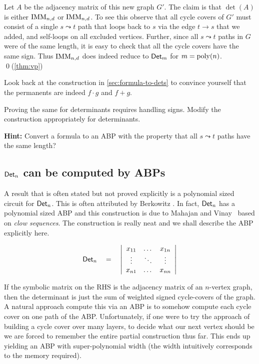 Let $A$ be the adjacency matrix of this new graph $G'$. 
The claim is that $\det(A)$ is either $\operatorname{\mathrm{IMM}}_{n,d}$ or $\operatorname{\mathrm{IMM}}_{n,d}$. 
To see this observe that all cycle covers of $G'$ must consist of a single $s\leadsto t$ path that loops back to $s$ via the edge $t\rightarrow s$ that we added, and self-loops on all excluded vertices. 
Further, since all $s\leadsto t$ paths in $G$ were of the same length, it is easy to check that all the cycle covers have the same sign. 
Thus $\operatorname{\mathrm{IMM}}_{n,d}$ does indeed reduce to $\operatorname{\mathsf{Det}}_m$ for $m = \operatorname{poly}(n)$. \qed {\footnotesize (\autoref{thm:vp})}\\

\begin{exercise}
Look back at the construction in \autoref{sec:formula-to-dets} to convince yourself that the permanents are indeed $f \cdot g$ and $f + g$. 

Proving the same for determinants requires handling signs. Modify the construction appropriately for determinants. 

{\bf Hint:} Convert a formula to an ABP with the property that all $s \leadsto t$ paths have the same length?
\end{exercise}


\subsection{$\operatorname{\mathsf{Det}}_n$ can be computed by ABPs}

A result that is often stated but not proved explicitly is a polynomial sized circuit for $\operatorname{\mathsf{Det}}_n$. 
This is often attributed by Berkowitz \cite{Berk84}. 
In fact, $\operatorname{\mathsf{Det}}_n$ has a polynomial sized ABP and this construction is due to Mahajan and Vinay~\cite{mv97} based on \emph{clow sequences}. 
The construction is really neat and we shall describe the ABP explicitly here. 

\[
\operatorname{\mathsf{Det}}_n \quad = \quad \left|\begin{array}{ccc}
x_{11} & \dots & x_{1n}\\
\vdots & \ddots & \vdots \\
x_{n1} & \dots & x_{nn}
\end{array}
\right|\]

If the symbolic matrix on the RHS is the adjacency matrix of an $n$-vertex graph, then the determinant is just the sum of weighted signed cycle-covers of the graph. 
A natural approach compute this via an ABP is to somehow compute each cycle cover on one path of the ABP. 
Unfortunately, if one were to try the \naive approach of building a cycle cover over many layers, to decide what our next vertex should be we are forced to remember the entire partial construction thus far. 
This ends up yielding an ABP with super-polynomial width (the width intuitively corresponds to the memory required). 

